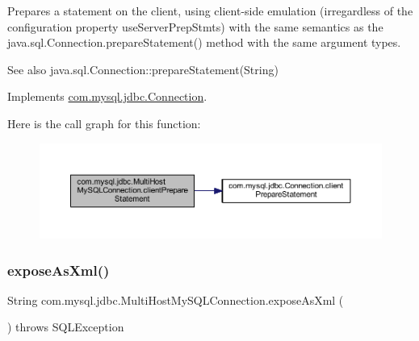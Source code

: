 Prepares a statement on the client, using client-\/side emulation (irregardless of the configuration property \textquotesingle{}use\+Server\+Prep\+Stmts\textquotesingle{}) with the same semantics as the java.\+sql.\+Connection.\+prepare\+Statement() method with the same argument types.

\begin{DoxySeeAlso}{See also}
java.\+sql.\+Connection\+::prepare\+Statement(\+String) 
\end{DoxySeeAlso}


Implements \mbox{\hyperlink{interfacecom_1_1mysql_1_1jdbc_1_1_connection_a1836d2e9bc2f4f47fb77b2418d08616a}{com.\+mysql.\+jdbc.\+Connection}}.

Here is the call graph for this function\+:
\nopagebreak
\begin{figure}[H]
\begin{center}
\leavevmode
\includegraphics[width=350pt]{classcom_1_1mysql_1_1jdbc_1_1_multi_host_my_s_q_l_connection_af9777071bc7848bd47f094d8ff57d54d_cgraph}
\end{center}
\end{figure}
\mbox{\label{classcom_1_1mysql_1_1jdbc_1_1_multi_host_my_s_q_l_connection_acaae1022ce53ec5e0ba07c1a90244af2}} 
\subsubsection{\texorpdfstring{expose\+As\+Xml()}{exposeAsXml()}}
{\footnotesize\ttfamily String com.\+mysql.\+jdbc.\+Multi\+Host\+My\+S\+Q\+L\+Connection.\+expose\+As\+Xml (\begin{DoxyParamCaption}{ }\end{DoxyParamCaption}) throws S\+Q\+L\+Exception}

